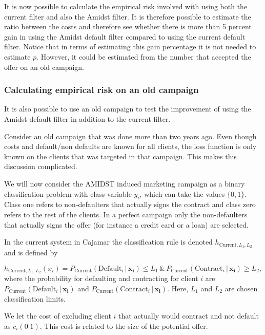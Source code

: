 \documentclass{article}
\theoremstyle{theorem}
\theoremstyle{definition}
\newcommand{\bv}[1]{\bm{#1}}
\begin{document}
{It is now possible to calculate the empirical risk involved with using both the current filter and also the Amidst filter.  It is therefore possible to estimate the ratio between the costs and therefore see whether there is more than 5 percent gain in using the Amidst default filter compared to using the current default filter.  Notice that in terms of estimating this gain percentage it is not needed to estimate $p$.  However, it could be estimated from the number that accepted the offer on an old campaign.


\subsubsection*{Calculating empirical risk on an old campaign}

It is also possible to use an old campaign to test the improvement of using the Amidst default filter in addition to the current filter. 

Consider an old campaign that was done more than two years ago. Even though costs and default/non defaults are known for all clients, the loss function is only known on the clients that was targeted in that campaign.  This makes this discussion complicated. 

We will now consider the AMIDST induced marketing campaign as a binary classification problem with class variable $y_i$, which can take the values $\{0,1\}$. Class one refers to non-defaulters that actually signs the contract and class zero refers to the rest of the clients.  In a perfect campaign only the non-defaulters that actually signs the offer (for instance a credit card or a loan) are selected.  

In the current system in Cajamar the classification rule is denoted $h_{\mbox{Current},L_1,L_2}$ and is defined by

\begin{equation}
\label{def:empRisk}
h_{\mbox{Current},L_1,L_2}(x_i) = P_{\mbox{Current}}(\mbox{Default}_i \,|\, \bv{x_i}) \leq L_1 \, \& \,P_{\mbox{Current}}(\mbox{Contract}_i \,|\, \bv{x_i}) \geq L_2,
\end{equation}
where the probability for defaulting and contracting for client $i$ are $P_{\mbox{Current}}(\mbox{Default}_i \,|\, \bv{x_i})$ and $P_{\mbox{Current}}(\mbox{Contract}_i \,|\, \bv{x_i})$.  Here, $L_1$ and $L_2$ are chosen classification limits. 

We let the cost of excluding client $i$ that actually would contract and not default as $c_i(0|1)$.  This cost is related to the size of the potential offer.

}
\end{document}
